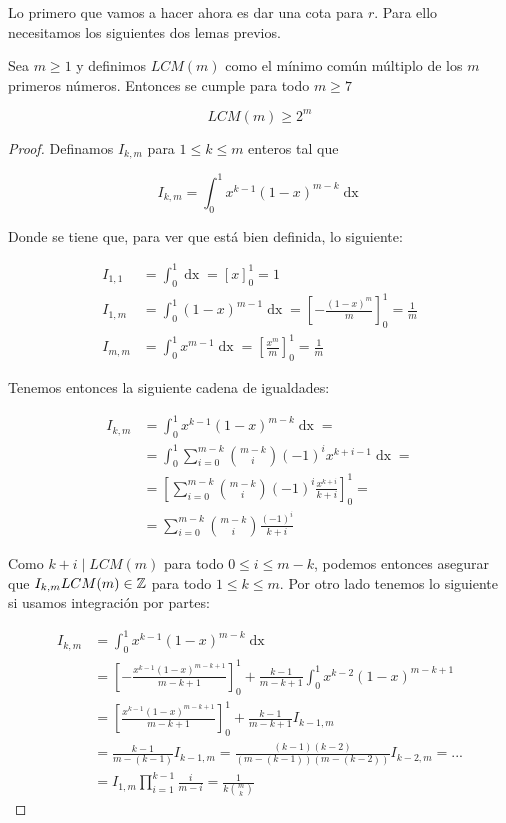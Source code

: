 Lo primero que vamos a hacer ahora es dar una cota para $r$. Para ello necesitamos los siguientes dos lemas previos.

\begin{lema}\label{desigualdad_LCM}
	Sea $m \geq 1$ y definimos $LCM(m)$ como el mínimo común múltiplo de los $m$ primeros números. Entonces se cumple para todo $m \geq 7$
	
	\begin{equation}
		LCM(m) \geq 2^m
	\end{equation}
\end{lema}

\begin{proof}
	Definamos $I_{k,m}$ para $1 \leq k \leq m$ enteros tal que
	
	\begin{equation}
	I_{k,m} = \int_{0}^{1}x^{k-1}(1-x)^{m-k}\mathop{dx}
	\end{equation}
	
	Donde se tiene que, para ver que está bien definida, lo siguiente:
	
	\begin{align}
	I_{1,1} &= \int_{0}^{1}\mathop{dx} = \left[x\right]_0^1 = 1\\
	I_{1,m} &= \int_{0}^{1}(1-x)^{m-1}\mathop{dx} = \left[-\frac{(1-x)^m}{m}\right]_0^1 = \frac{1}{m}\\
	I_{m,m} &= \int_{0}^{1}x^{m-1}\mathop{dx} = \left[\frac{x^m}{m}\right]_0^1 = \frac{1}{m}
	\end{align}
	
	Tenemos entonces la siguiente cadena de igualdades:
	
	\begin{align}
	I_{k,m} &= \int_{0}^{1}x^{k-1}(1-x)^{m-k}\mathop{dx} =\\
	&= \int_{0}^{1}\sum_{i=0}^{m-k}\binom{m-k}{i}(-1)^ix^{k+i-1}\mathop{dx} =\\
	&= \left[\sum_{i=0}^{m-k}\binom{m-k}{i}(-1)^i\frac{x^{k+i}}{k+i}\right]_0^1 =\\
	&= \sum_{i=0}^{m-k}\binom{m-k}{i}\frac{(-1)^i}{k+i}
	\end{align}
	
	Como $k+i \mid LCM(m)$ para todo $0 \leq i \leq m-k$, podemos entonces asegurar que $I_{k,m}LCM(m) \in \mathbb{Z}$ para todo $1 \leq k \leq m$. Por otro lado tenemos lo siguiente si usamos integración por partes:
	
	\begin{align}
	I_{k,m} &= \int_{0}^{1}x^{k-1}(1-x)^{m-k}\mathop{dx}\\
	&= \left[-\frac{x^{k-1}(1-x)^{m-k+1}}{m-k+1}\right]_0^1 + \frac{k-1}{m-k+1}\int_{0}^{1}x^{k-2}(1-x)^{m-k+1}\\
	&= \left[\frac{x^{k-1}(1-x)^{m-k+1}}{m-k+1}\right]_0^1 + \frac{k-1}{m-k+1}I_{k-1,m}\\
	&= \frac{k-1}{m-(k-1)}I_{k-1,m} = \frac{(k-1)(k-2)}{(m-(k-1))(m-(k-2))}I_{k-2,m} =...\\
	&= I_{1,m}\prod_{i=1}^{k-1}\frac{i}{m-i} = \frac{1}{k\displaystyle\binom{m}{k}}
	\end{align}
	

\end{proof}
